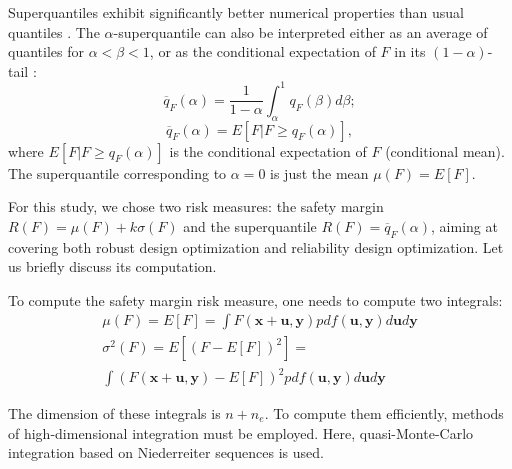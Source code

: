 \documentclass{llncs}
\begin{document}
Superquantiles exhibit significantly better numerical properties than usual quantiles \cite{RockafellarRoyset2010}. The $\alpha$-superquantile can also be interpreted either as an average of quantiles  for $\alpha < \beta <1$, or as the conditional expectation of $F$ in its $(1−\alpha)$-tail \cite{RockafellarRoyset2015}:
\[
\overline{q}_F(\alpha) = \frac{1}{1-\alpha} \int_\alpha^1q_F(\beta)d\beta ;
\]
\[
\overline{q}_F(\alpha) = E\left[F|F\geq q_F(\alpha)\right],
\]
where $E\left[F|F\geq q_F(\alpha)\right]$ is the conditional expectation of $F$ (conditional mean). The superquantile corresponding to $\alpha = 0$ is just the mean $\mu(F)=E[F]$.

For this study, we chose two risk measures: the safety margin $R(F)=\mu(F)+k\sigma(F)$ and the superquantile $R(F)=\overline{q}_F(\alpha)$, aiming at covering both robust design optimization and reliability design optimization. Let us briefly discuss its computation.

To compute the safety margin risk measure, one needs to compute two integrals:
\begin{displaymath}
  \begin{array}{c}
    \mu (F)=E[F]=\int F(\pmb x + \pmb u, \pmb y)p df(\pmb u, \pmb y)d\pmb u d\pmb y \\
    \sigma^2(F)=E[(F-E[F])^2]=\\\int(F(\pmb x + \pmb u, \pmb y)-E[F])^2 p df(\pmb u, \pmb y)d\pmb u d\pmb y
  \end{array}
\end{displaymath}

The dimension of these integrals is $n+n_e$. To compute them efficiently, methods of high-dimensional integration must be employed. Here, quasi-Monte-Carlo integration \cite{Caflisch1998} based on Niederreiter sequences \cite{Niederreiter1992} is used.
\end{document}
